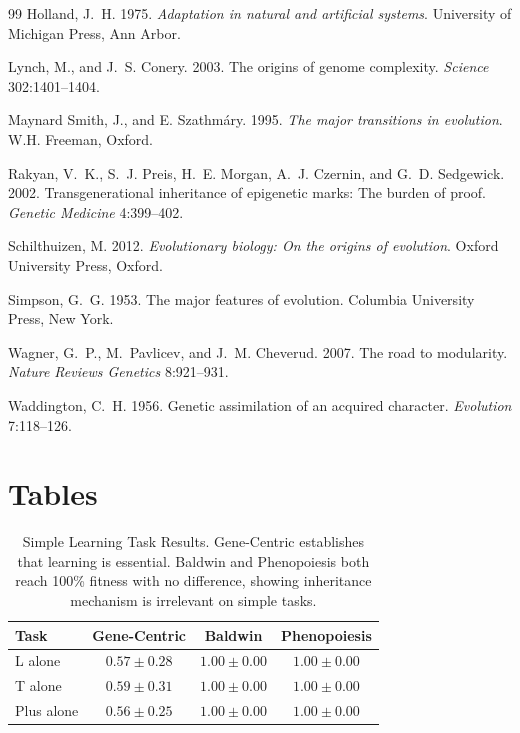\documentclass[11pt]{article}
\begin{document}
\begin{thebibliography}{99}
Holland, J.~H. 1975. \textit{Adaptation in natural and artificial systems}. University of Michigan Press, Ann Arbor.

Lynch, M., and J.~S. Conery. 2003. The origins of genome complexity. \textit{Science} 302:1401--1404.

Maynard Smith, J., and E. Szathmáry. 1995. \textit{The major transitions in evolution}. W.H. Freeman, Oxford.

Rakyan, V.~K., S.~J. Preis, H.~E. Morgan, A.~J. Czernin, and G.~D. Sedgewick. 2002. Transgenerational inheritance of epigenetic marks: The burden of proof. \textit{Genetic Medicine} 4:399--402.

Schilthuizen, M. 2012. \textit{Evolutionary biology: On the origins of evolution}. Oxford University Press, Oxford.

Simpson, G.~G. 1953. The major features of evolution. Columbia University Press, New York.

Wagner, G.~P., M.~Pavlicev, and J.~M. Cheverud. 2007. The road to modularity. \textit{Nature Reviews Genetics} 8:921--931.

Waddington, C.~H. 1956. Genetic assimilation of an acquired character. \textit{Evolution} 7:118--126.

\end{thebibliography}

\newpage{}

\section*{Tables}

\begin{table}[h!]
\centering
\caption{Simple Learning Task Results. Gene-Centric establishes that learning is essential. Baldwin and Phenopoiesis both reach 100\% fitness with no difference, showing inheritance mechanism is irrelevant on simple tasks.}
\label{Table:1}
\begin{tabular}{lccc}
\toprule
\textbf{Task} & \textbf{Gene-Centric} & \textbf{Baldwin} & \textbf{Phenopoiesis} \\
\midrule
L alone & $0.57 \pm 0.28$ & $1.00 \pm 0.00$ & $1.00 \pm 0.00$ \\
T alone & $0.59 \pm 0.31$ & $1.00 \pm 0.00$ & $1.00 \pm 0.00$ \\
Plus alone & $0.56 \pm 0.25$ & $1.00 \pm 0.00$ & $1.00 \pm 0.00$ \\
\bottomrule
\end{tabular}
\end{table}
\end{document}
